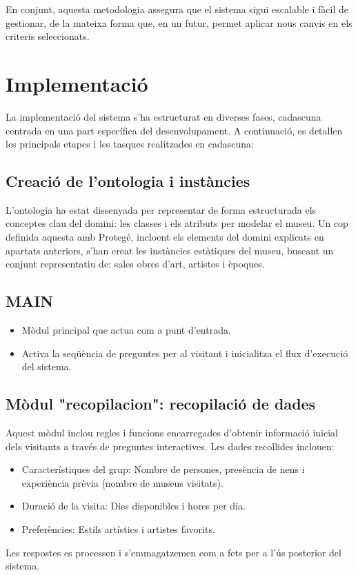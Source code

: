 \documentclass[a4paper]{article}
\begin{document}
	En conjunt, aquesta metodologia assegura que el sistema sigui escalable i fàcil de gestionar, de la mateixa forma que, en un futur, permet aplicar nous canvis en els criteris seleccionats.

	
	\newpage
	\section{Implementació}
	
	La implementació del sistema s'ha estructurat en diverses fases, cadascuna centrada en una part específica del desenvolupament. A continuació, es detallen les principals etapes i les tasques realitzades en cadascuna:
	
	\subsection{Creació de l’ontologia i instàncies}
	
	L’ontologia ha estat dissenyada per representar de forma estructurada els conceptes clau del domini: les classes i els atributs per modelar el museu. Un cop definida aquesta amb Protegé, incloent els elements del domini explicats en apartats anteriors, s'han creat les instàncies estàtiques del museu, buscant un conjunt representatiu de: sales obres d'art, artistes i èpoques.
	
	\subsection{MAIN}
	\begin{itemize}
		\item Mòdul principal que actua com a punt d’entrada.
		\item Activa la seqüència de preguntes per al visitant i inicialitza el flux d’execució del sistema.
	\end{itemize}
	
	
	\subsection{Mòdul "recopilacion": recopilació de dades}
	
	Aquest mòdul inclou regles i funcions encarregades d'obtenir informació inicial dels visitants a través de preguntes interactives. Les dades recollides inclouen:
	\begin{itemize}
		\item Característiques del grup: Nombre de persones, presència de nens i experiència prèvia (nombre de museus visitats).
		\item Duració de la visita: Dies disponibles i hores per dia.
		\item Preferències: Estils artístics i artistes favorits.
	\end{itemize}
	Les respostes es processen i s'emmagatzemen com a fets per a l'ús posterior del sistema.
	
\end{document}
